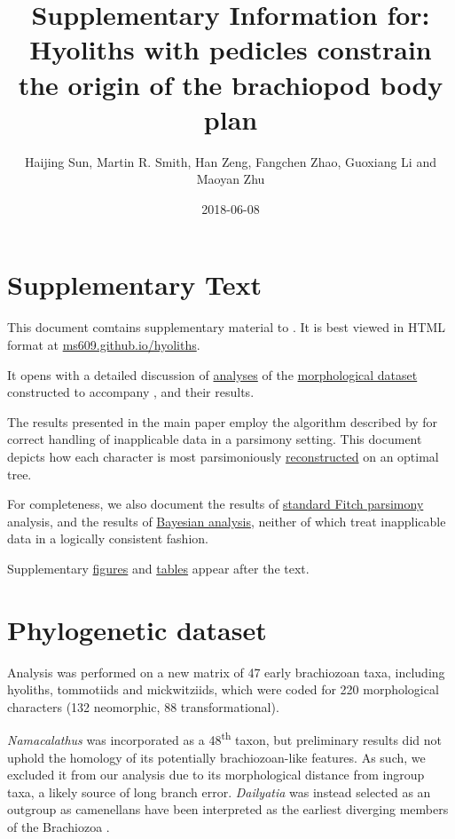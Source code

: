 \documentclass[openany]{book}
\title{Supplementary Information for: \newline\newline Hyoliths with pedicles
constrain the origin of the brachiopod body plan}
\author{Haijing Sun, Martin R. Smith, Han Zeng, Fangchen Zhao, Guoxiang Li and
Maoyan Zhu}
\date{2018-06-08}
\theoremstyle{definition}
\theoremstyle{definition}
\theoremstyle{definition}
\theoremstyle{remark}
\begin{document}
\maketitle

{
\setcounter{tocdepth}{1}
\tableofcontents
}
\chapter*{Supplementary Text}\label{supplementary-text}

This document comtains supplementary material to
\citet{Sun2018Hyolithswith}. It is best viewed in HTML format at
\href{https://ms609.github.io/hyoliths/}{ms609.github.io/hyoliths}.

It opens with a detailed discussion of
\protect\hyperlink{treesearch}{analyses} of the
\protect\hyperlink{dataset}{morphological dataset} constructed to
accompany \citet{Sun2018Hyolithswith}, and their results.

The results presented in the main paper employ the algorithm described
by \citet{Brazeau2018} for correct handling of inapplicable data in a
parsimony setting. This document depicts how each character is most
parsimoniously \protect\hyperlink{reconstructions}{reconstructed} on an
optimal tree.

For completeness, we also document the results of
\protect\hyperlink{fitch}{standard Fitch parsimony} analysis, and the
results of \protect\hyperlink{bayesian}{Bayesian analysis}, neither of
which treat inapplicable data in a logically consistent fashion.

Supplementary \protect\hyperlink{figures}{figures} and
\protect\hyperlink{table}{tables} appear after the text.

\hypertarget{dataset}{\chapter{Phylogenetic dataset}\label{dataset}}

Analysis was performed on a new matrix of 47 early brachiozoan taxa,
including hyoliths, tommotiids and mickwitziids, which were coded for
220 morphological characters (132 neomorphic, 88 transformational).

\emph{Namacalathus} was incorporated as a 48\textsuperscript{th} taxon,
but preliminary results did not uphold the homology of its potentially
brachiozoan-like features. As such, we excluded it from our analysis due
to its morphological distance from ingroup taxa, a likely source of long
branch error. \emph{Dailyatia} was instead selected as an outgroup as
camenellans have been interpreted as the earliest diverging members of
the Brachiozoa \citep{Skovsted2015Theearly, Zhao2017}.
\end{document}
